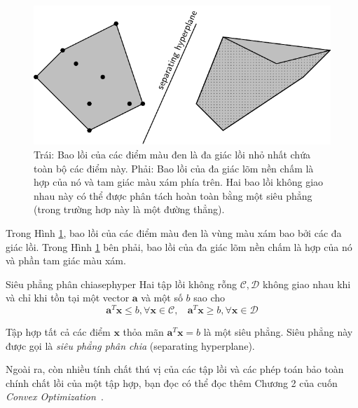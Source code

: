\begin{figure}[t]
\centering
\includegraphics[width = .7\textwidth]{Chapters/08_ConvexOptimization/16_convexity/latex/convex_hull.pdf}
\caption[]{Trái: Bao lồi của các điểm màu đen là đa giác lồi nhỏ nhất chứa toàn bộ các điểm này. Phải: Bao lồi của đa giác lõm nền chấm là hợp của nó và tam giác màu xám phía trên. Hai bao lồi không giao nhau này có thể được phân tách hoàn toàn bằng một siêu phẳng (trong trường hơp này là một đường thẳng).}
\label{fig:16_convex_hull}
\captionsetup[figure]{format=rule, justification=centering}
\end{figure}


Trong Hình \ref{fig:16_convex_hull}, bao lồi của các điểm màu đen là vùng
màu xám bao bởi các đa giác lồi. Trong Hình \ref{fig:16_convex_hull} bên phải,
bao lồi của đa giác lõm nền chấm là hợp của nó và phần tam giác màu xám.

\begin{mytheo}{Siêu phẳng phân chia}{sephyper}
Hai {tập lồi không rỗng} $\mathcal{C}, \mathcal{D}$  {không giao
nhau} khi và chỉ khi tồn tại một vector $\mathbf{a}$ và một số $b$ sao cho
\begin{equation*}
\mathbf{a}^T\mathbf{x} \leq b, \forall \mathbf{x} \in \mathcal{C}, ~~ \text{}~~ \mathbf{a}^T\mathbf{x} \geq b, \forall \mathbf{x} \in \mathcal{D}
\end{equation*}

Tập hợp tất cả các điểm $\mathbf{x}$ thỏa mãn $\mathbf{a}^T\mathbf{x} = b$ là một siêu phẳng. Siêu phẳng này được gọi là \textit{siêu phẳng phân chia} ({separating hyperplane}).
\end{mytheo}

Ngoài ra, còn nhiều tính chất thú vị của các tập lồi và các phép toán bảo toàn
chính chất {lồi} của một tập hợp, bạn đọc có thể đọc thêm
Chương 2 của cuốn \textit{Convex Optimization}~\cite{boyd2004convex}.


